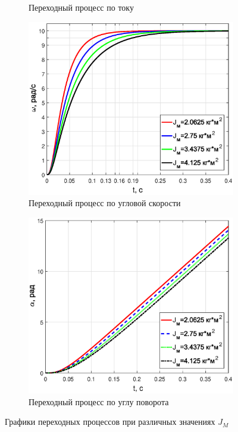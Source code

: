 \documentclass[12pt,a4paper]{article}
\begin{document}
\begin{figure}[H]
\begin{subfigure}[b]{0.48\textwidth}
		\caption{Переходный процесс по току}
	\end{subfigure}
	\begin{subfigure}[b]{0.48\textwidth}
		\includegraphics[width = \textwidth]{w2}
		\caption{Переходный процесс по угловой скорости}
	\end{subfigure}
	\hfill
	\begin{subfigure}[b]{0.48\textwidth}
		\includegraphics[width = \textwidth]{a2}
		\caption{Переходный процесс по углу поворота}
	\end{subfigure}
	\caption{Графики переходных процессов при различных значениях $J_M$}
	\label{UIwa2}
\end{figure}
\end{document}
